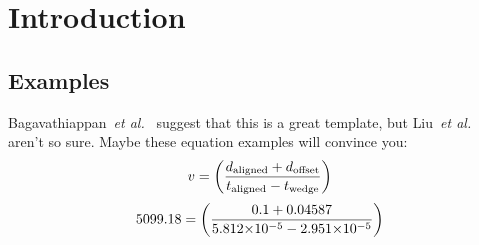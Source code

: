 \documentclass{UoSclass} %
\begin{document}

\cleardoublepage
{}



\pagestyle{fancy}%

\chapter{Introduction}
\setcounter{page}{1}

\lipsum[1]

\section{Examples}

Bagavathiappan~\textit{et al.}~\cite{Bagavathiappan2013} suggest that this is a great template, but Liu~\textit{et al.}~\cite{Liu2022} aren't so sure. Maybe these equation examples will convince you:
%
\begin{equation} \label{eq:velocitytext}
    v = \left( \frac{d_{\textrm{aligned}} + d_{\textrm{offset}}}{t_{\textrm{aligned}} - t_{\textrm{wedge}}} \right)
    \tagaddtext{[\si{\meter\per\second}]}
\end{equation} 
%
\begin{equation} \label{eq:velocitynum}
    5099.18 = \left( \frac{0.1 + 0.04587}{5.812{\times}10^{-5} - 2.951{\times}10^{-5}} \right)
    \tagaddtext{[\si{\meter\per\second}]}
\end{equation} 
%

\clearpage
\end{document}
